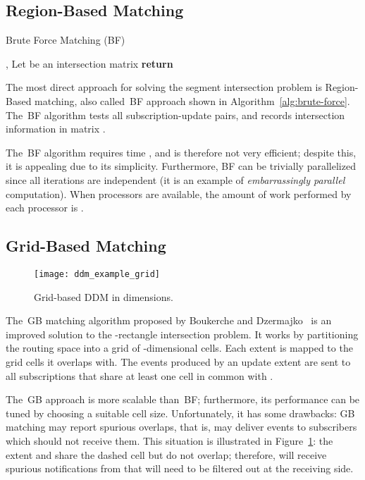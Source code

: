 \documentclass[10pt, conference, compsocconf]{IEEEtran}
\begin{document}
\subsection{Region-Based Matching}

\begin{algorithm}[t]
\caption{Brute Force Matching (BF)}\label{alg:brute-force}
\begin{algorithmic}
\State , 
\State Let  be an  intersection matrix
\ForAll{}
\ForAll{}
\State  {}
\EndFor
\EndFor
\State \textbf{return} 
\EndFunction
\end{algorithmic}
\end{algorithm}

The most direct approach for solving the segment intersection problem
is Region-Based matching, also called~\acf{BF} approach shown in
Algorithm~\ref{alg:brute-force}. The~\ac{BF} algorithm tests all  subscription-update pairs, and records intersection
information in matrix .

The~\ac{BF} algorithm requires time , and is therefore not very
efficient; despite this, it is appealing due to its
simplicity. Furthermore, \ac{BF} can be trivially parallelized since
all iterations are independent (it is an example of
\emph{embarrassingly parallel} computation). When  processors are
available, the amount of work performed by each processor is
.

\subsection{Grid-Based Matching}\label{sec:grid-based-matching}

\begin{figure}[t]
\centering\texttt{[image: ddm\_example\_grid]}
\caption{Grid-based DDM in  dimensions.}\label{fig:ddm_example_grid}
\end{figure}

The~\acf{GB} matching algorithm proposed by Boukerche and
Dzermajko~\cite{Boukerche2001} is an improved solution to the
-rectangle intersection problem. It works by partitioning the
routing space into a grid of -dimensional cells. Each extent is
mapped to the grid cells it overlaps with. The events produced by an
update extent  are sent to all subscriptions that share at least
one cell in common with .

The~\ac{GB} approach is more scalable than~\ac{BF}; furthermore, its
performance can be tuned by choosing a suitable cell
size. Unfortunately, it has some drawbacks: \ac{GB} matching may
report spurious overlaps, that is, may deliver events to subscribers
which should not receive them. This situation is illustrated in
Figure~\ref{fig:ddm_example_grid}: the extent  and  share
the dashed cell but do not overlap; therefore,  will receive
spurious notifications from  that will need to be filtered out at
the receiving side.
\end{document}
